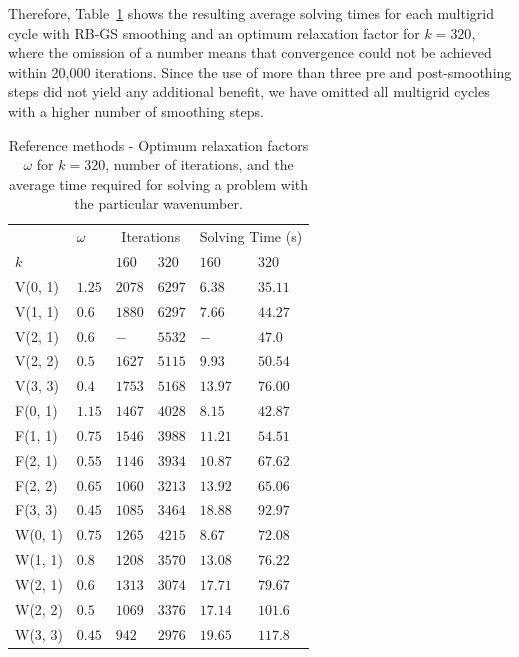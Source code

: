 Therefore, Table~\ref{table:reference-methods-helmholtz} shows the resulting average solving times for each multigrid cycle with RB-GS smoothing and an optimum relaxation factor for $k = 320$, where the omission of a number means that convergence could not be achieved within 20,000 iterations. 
Since the use of more than three pre and post-smoothing steps did not yield any additional benefit, we have omitted all multigrid cycles with a higher number of smoothing steps.
\begin{table}
	\caption{Reference methods - Optimum relaxation factors $\omega$ for $k = 320$, number of iterations, and the average time required for solving a problem with the particular wavenumber.}
	\label{table:reference-methods-helmholtz}
	\centering
	\begin{tabular}{l l l l l l}
		\toprule
		& $\omega$ & \multicolumn{2}{c}{Iterations} & \multicolumn{2}{c}{Solving Time (s)} \\
		\cmidrule(r){3-4} \cmidrule(r){5-6}
		$k$ & & $160$ & $320$ & $160$ & $320$ \\
		\midrule
		V(0, 1) & $1.25$ & $2078$ & $6297$ & $6.38$ & $35.11$ \\
		\midrule
		V(1, 1) & $0.6$ & $1880$ & $6297$ & $7.66$ & $44.27$ \\
		\midrule
		V(2, 1) & $0.6$ & $-$ & $5532$ & $-$ & $47.0$ \\
		\midrule
		V(2, 2) & $0.5$ & $1627$ & $5115$ & $9.93$ & $50.54$  \\
		\midrule
		V(3, 3) & $0.4$ & $1753$ & $5168$ & $13.97$ & $76.00$ \\
		\midrule
		F(0, 1) & $1.15$ & $1467$ & $4028$ & $8.15$ & $42.87$  \\
		\midrule
		F(1, 1) & $0.75$ & $1546$ & $3988$ & $11.21$ & $54.51$ \\
		\midrule
		F(2, 1) & $0.55$ & $1146$ & $3934$ & $10.87$ & $67.62$ \\
		\midrule
		F(2, 2) & $0.65$ & $1060$ & $3213$ & $13.92$ & $65.06$ \\
		\midrule
		F(3, 3) & $0.45$ & $1085$ & $3464$ & $18.88$ & $92.97$ \\
		\midrule
		W(0, 1) & $0.75$ & $1265$ & $4215$ & $8.67$ & $72.08$ \\
		\midrule
		W(1, 1) & $0.8$ & $1208$ & $3570$ & $13.08$ & $76.22$ \\
		\midrule
		W(2, 1) & $0.6$ & $1313$ & $3074$ & $17.71$ & $79.67$ \\
		\midrule
		W(2, 2) & $0.5$ & $1069$ & $3376$ & $17.14$ & $101.6$ \\
		\midrule
		W(3, 3) & $0.45$ & $942$ & $2976$ & $19.65$ & $117.8$ \\
		\bottomrule
	\end{tabular}
\end{table}
